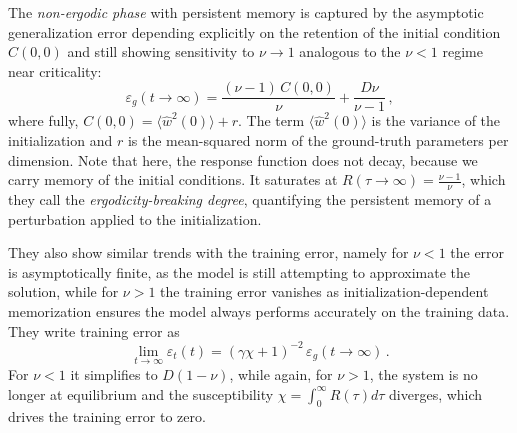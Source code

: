 \documentclass[11pt]{article}
\begin{document}
The \textit{non-ergodic phase} with persistent memory is captured by the asymptotic generalization error depending explicitly on the retention of the initial condition $C(0,0)$ and still showing sensitivity to $\nu \to 1$ analogous to the $\nu<1$ regime near criticality:
\begin{equation}
\varepsilon_g(t\to\infty)=\frac{(\nu-1)\,C(0,0)}{\nu}+\frac{D\nu}{\nu-1}\,, 
\label{alpha>1ge}
\end{equation}
where fully, $C(0,0) = \langle \hat{w}^2(0)\rangle + r$.  The term $\langle \hat{w}^2(0)\rangle$ is the variance of the initialization and $r$ is the mean-squared norm of the ground-truth parameters per dimension.  Note that here, the response function does not decay, because we carry memory of the initial conditions.  It saturates at $R(\tau \to \infty)=\frac{\nu-1}{\nu}$, which they call the \textit{ergodicity-breaking degree}, quantifying the persistent memory of a perturbation applied to the initialization. 
%
%

They also show similar trends with the training error, namely for $\nu<1$ the error is asymptotically finite, as the model is still attempting to approximate the solution, while for $\nu>1$ the training error vanishes as initialization-dependent memorization ensures the model always performs accurately on the training data.  They write training error as
\begin{equation}
\lim_{t \to \infty}\varepsilon_{t}(t)=(\gamma \chi+1)^{-2}\,\varepsilon_g(t\to\infty)\,.
\end{equation} 
For $\nu<1$ it simplifies to $D(1-\nu)$, while again, for $\nu>1$, the system is no longer at equilibrium and the susceptibility $\chi=\int_0^{\infty}R(\tau)d\tau$ diverges, which drives the training error to zero.
\end{document}
